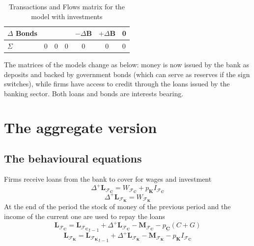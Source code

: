 \begin{table}
\begin{tabular}{l|ccccc|l}
        $\Delta$ Bonds         &                                 &                                                                                                             &                                                                                                             & $-\Delta\mathbf{B}$                                       & $+\Delta\mathbf{B}$ & 0        \\
        \midrule
        $\Sigma$               & 0                               & 0                                                                                                           & 0                                                                                                           & 0                                                         & 0                   & 0        \\
    \end{tabular}
    \caption{Transactions and Flows matrix for the model with investments}
\end{table}

The matrices of the models change as below: money is now issued by the bank as deposits and backed by government bonds (which can serve as reserves if the sign switches), while firms have access to credit through the loans issued by the banking sector.
Both loans and bonds are interests bearing.

\section{The aggregate version}
\subsection{The behavioural equations}
Firms receive loans from the bank to cover for wages and investment $$\Delta^+ \mathbf{L}_{\mathcal{F}_\mathbf{C}} = W_{\mathcal{F}_\mathbf{C}} + p_\mathbf{K} I_{\mathcal{F}_\mathbf{C}}$$ $$\Delta^+\mathbf{L}_{\mathcal{F}_\mathbf{K}} = W_{\mathcal{F}_\mathbf{K}}$$
At the end of the period the stock of money of the previous period and the income of the current one are used to repay the loans $$\mathbf{L}_{\mathcal{F}_\mathbf{C}} = {\mathbf{L}_{\mathcal{F}_\mathbf{C}}}_{t-1} + \Delta^+\mathbf{L}_{\mathcal{F}_\mathbf{C}} - {\mathbf{M}_{\mathcal{F}_\mathbf{C}}} - p_\mathbf{C} (C + G)$$ $$\mathbf{L}_{\mathcal{F}_\mathbf{K}} = {\mathbf{L}_{\mathcal{F}_\mathbf{K}}}_{t-1} + \Delta^+\mathbf{L}_{\mathcal{F}_\mathbf{K}} - {\mathbf{M}_{\mathcal{F}_\mathbf{K}}} - p_\mathbf{K} I_{\mathcal{F}_\mathbf{C}}$$

